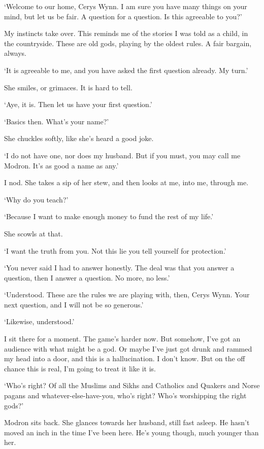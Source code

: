 `Welcome to our home, Cerys Wynn. I am sure you have many things on
your mind, but let us be fair. A question for a question. Is this
agreeable to you?'

My instincts take over. This reminds me of the stories I was told as a
child, in the countryside. These are old gods, playing by the oldest
rules. A fair bargain, always.

`It is agreeable to me, and you have asked the first question
already. My turn.'

She smiles, or grimaces. It is hard to tell.

`Aye, it is. Then let us have your first question.'

`Basics then. What's your name?'

She chuckles softly, like she's heard a good joke.

`I do not have one, nor does my husband. But if you must, you may call
me Modron. It's as good a name as any.'

I nod. She takes a sip of her stew, and then looks at me, into me,
through me.

`Why do you teach?'

`Because I want to make enough money to fund the rest of my life.'

She scowls at that.

`I want the truth from you. Not this lie you tell yourself for
protection.'

`You never said I had to answer honestly. The deal was that you answer
a question, then I answer a question. No more, no less.'

`Understood. These are the rules we are playing with, then, Cerys
Wynn. Your next question, and I will not be so generous.'

`Likewise, understood.'

I sit there for a moment. The game's harder now. But somehow, I've got
an audience with what might be a god. Or maybe I've just got drunk %
and rammed my head into a door, and this is a hallucination. I don't
know. But on the off chance this is real, I'm going to treat it like
it is.

`Who's right? Of all the Muslims and Sikhs and Catholics and Quakers
and Norse pagans and whatever-else-have-you, who's right? Who's
worshipping the right gods?'

Modron sits back. She glances towards her husband, still fast
asleep. He hasn't moved an inch in the time I've been here. He's young
though, much younger than her.

